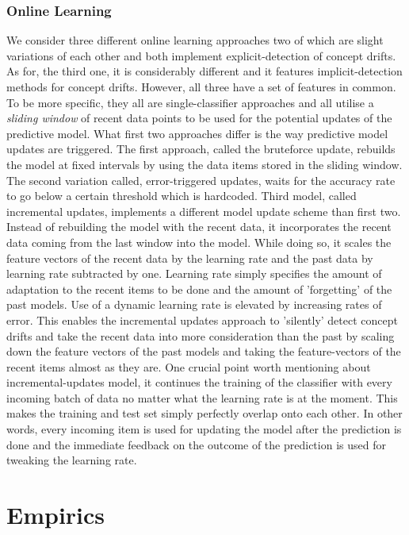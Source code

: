 \documentclass{article} %
\begin{document}
\subsubsection{Online Learning}
We consider three different online learning approaches two of which are slight variations of each other and both implement explicit-detection of concept drifts. As for, the third one, it is considerably different and it features implicit-detection methods for concept drifts. However, all three have a set of  features in common. To be more specific, they all are single-classifier approaches and all utilise a \textit{sliding window} of recent data points to be used for the potential updates of the predictive model. What first two approaches differ is the way predictive model updates are triggered. The first approach, called the bruteforce update, rebuilds the model at fixed intervals by using the data items stored in the sliding window.\cite[p. 24]{streamingSlides} The second variation called, error-triggered updates, waits for the accuracy rate to go below a certain threshold which is hardcoded. Third model, called incremental updates, implements a different model update scheme than first two. Instead of rebuilding the model with the recent data, it incorporates the recent data coming from the last window into the model. While doing so, it scales the feature vectors of the recent data by the learning rate and the past data by learning rate subtracted by one. Learning rate simply specifies the amount of adaptation to the recent items to be done and the amount of 'forgetting' of the past models. Use of a dynamic learning rate is elevated by increasing rates of error. This enables the incremental updates approach to 'silently' detect concept drifts and take the recent data into more consideration than the past by scaling down the feature vectors of the past models and taking the feature-vectors of the recent items almost as they are. One crucial point worth mentioning about incremental-updates model, it continues the training of the classifier with every incoming batch of data no matter what the learning rate is at the moment. This makes the training and test set simply perfectly overlap onto each other. In other words, every incoming item is used for updating the model after the prediction is done and the immediate feedback on the outcome of the prediction is used for tweaking the learning rate. 

\section{Empirics}
\end{document}
